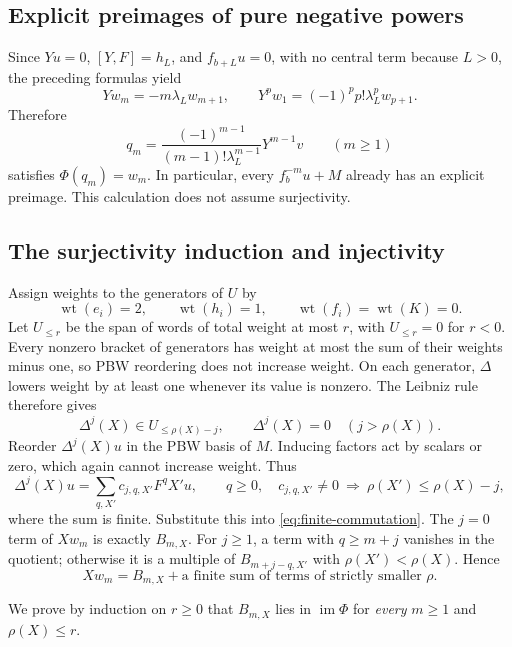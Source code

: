 \documentclass[11pt]{article}
\newcommand{\wt}{\operatorname{wt}}
\theoremstyle{definition}
\begin{document}
\subsection{Explicit preimages of pure negative powers}

Since \(Yu=0\), \([Y,F]=h_L\), and \(f_{b+L}u=0\), with no central
term because \(L>0\), the preceding formulas yield
\[
 Yw_m=-m\lambda_Lw_{m+1},\qquad
 Y^pw_1=(-1)^pp!\lambda_L^pw_{p+1}.
\]
Therefore
\begin{equation}\label{eq:pure-preimage}
 q_m=\frac{(-1)^{m-1}}{(m-1)!\lambda_L^{m-1}}Y^{m-1}v
 \qquad(m\ge1)
\end{equation}
satisfies \(\Phi(q_m)=w_m\). In particular, every \(f_b^{-m}u+M\)
already has an explicit preimage. This calculation does not assume
surjectivity.

\subsection{The surjectivity induction and injectivity}

Assign weights to the generators of \(U\) by
\[
 \wt(e_i)=2,\qquad\wt(h_i)=1,\qquad\wt(f_i)=\wt(K)=0.
\]
Let \(U_{\le r}\) be the span of words of total weight at most \(r\),
with \(U_{\le r}=0\) for \(r<0\). Every nonzero bracket of generators
has weight at most the sum of their weights minus one, so PBW
reordering does not increase weight. On each generator, \(\Delta\)
lowers weight by at least one whenever its value is nonzero. The
Leibniz rule therefore gives
\[
 \Delta^j(X)\in U_{\le\rho(X)-j},\qquad
 \Delta^j(X)=0\quad(j>\rho(X)).
\]
Reorder \(\Delta^j(X)u\) in the PBW basis of \(M\). Inducing factors
act by scalars or zero, which again cannot increase weight. Thus
\[
 \Delta^j(X)u=\sum_{q,X'}c_{j,q,X'}F^qX'u,\qquad
 q\ge0,\quad
 c_{j,q,X'}\ne0\ \Longrightarrow\ \rho(X')\le\rho(X)-j,
\]
where the sum is finite. Substitute this into
\eqref{eq:finite-commutation}. The \(j=0\) term of \(Xw_m\) is
exactly \(B_{m,X}\). For \(j\ge1\), a term with \(q\ge m+j\) vanishes
in the quotient; otherwise it is a multiple of \(B_{m+j-q,X'}\)
with \(\rho(X')<\rho(X)\). Hence
\begin{equation}\label{eq:triangular}
 Xw_m=B_{m,X}
       +\text{a finite sum of terms of strictly smaller }\rho.
\end{equation}

We prove by induction on \(r\ge0\) that \(B_{m,X}\) lies in
\(\operatorname{im}\Phi\) for \emph{every} \(m\ge1\) and
\(\rho(X)\le r\).
\end{document}
